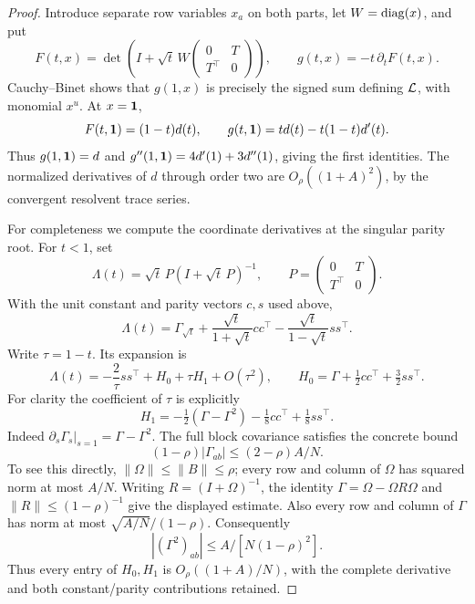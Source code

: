 \begin{proof}
Introduce separate row variables \(x_a\) on both parts,
let \(W=\operatorname{diag}(x)\), and put
\[
 F(t,x)=\det\left(I+\sqrt t\,W
                   \begin{pmatrix}0&T\\T^\top&0\end{pmatrix}\right),
 \qquad g(t,x)=-t\,\partial_tF(t,x).
\]
Cauchy--Binet shows that \(g(1,x)\) is precisely the signed
sum defining \({\cal L}\), with monomial \(x^u\).
At \(x=\mathbf1\),
\[
 F(t,\mathbf1)=(1-t)d(t),\qquad
 g(t,\mathbf1)=t d(t)-t(1-t)d'(t).
\]
Thus \(g(1,\mathbf1)=d\) and
\(g''(1,\mathbf1)=4d'(1)+3d''(1)\), giving the first identities.
The normalized derivatives of \(d\) through order two are
\(O_\rho((1+A)^2)\), by the convergent resolvent trace series.

For completeness we compute the coordinate derivatives at
the singular parity root. For \(t<1\), set
\[
 \Lambda(t)=\sqrt t\,P(I+\sqrt t\,P)^{-1},
       \qquad P=\begin{pmatrix}0&T\\T^\top&0\end{pmatrix}.
\]
With the unit constant and parity vectors \(c,s\) used above,
\[
 \Lambda(t)=\Gamma_{\sqrt t}
      +\frac{\sqrt t}{1+\sqrt t}cc^\top
      -\frac{\sqrt t}{1-\sqrt t}ss^\top .
\]
Write \(\tau=1-t\). Its expansion is
\[
 \Lambda(t)=-\frac2\tau ss^\top+H_0+\tau H_1+O(\tau^2),
 \qquad H_0=\Gamma+\tfrac12cc^\top+\tfrac32ss^\top .
\]
For clarity the coefficient of \(\tau\) is explicitly
\[
 H_1=-\tfrac12(\Gamma-\Gamma^2)
                  -\tfrac18cc^\top+\tfrac18ss^\top .
\]
Indeed \(\partial_s\Gamma_s|_{s=1}=\Gamma-\Gamma^2\).
The full block covariance satisfies the concrete bound
\[
 (1-\rho)|\Gamma_{ab}|\leq(2-\rho)A/N .
\]
To see this directly, \(\|\Omega\|\leq\|B\|\leq\rho\);
every row and column of \(\Omega\) has squared norm at most
\(A/N\). Writing \(R=(I+\Omega)^{-1}\), the identity
\(\Gamma=\Omega-\Omega R\Omega\) and
\(\|R\|\leq(1-\rho)^{-1}\) give the displayed estimate.
Also every row and column of \(\Gamma\) has norm at most
\(\sqrt{A/N}/(1-\rho)\). Consequently
\[
 |(\Gamma^2)_{ab}|\leq A/[N(1-\rho)^2] .
\]
Thus every entry of \(H_0,H_1\) is
\(O_\rho((1+A)/N)\), with the complete derivative and both
constant/parity contributions retained.


\end{proof}
